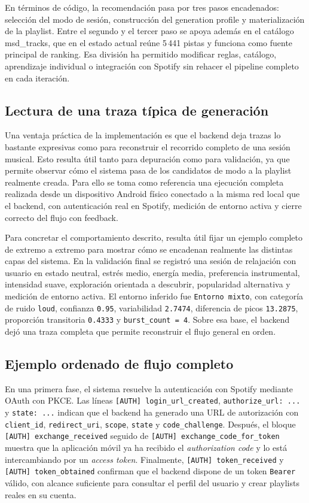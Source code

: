 En términos de código, la recomendación pasa por tres pasos encadenados:
selección del modo de sesión, construcción del generation profile y
materialización de la playlist. Entre el segundo y el tercer paso se apoya
además en el catálogo msd\_tracks, que en el estado actual reúne 5\,441
pistas y funciona como fuente principal de ranking. Esa división ha permitido
modificar reglas, catálogo, aprendizaje individual o integración con Spotify
sin rehacer el pipeline completo en cada iteración.

\subsection{Lectura de una traza típica de generación}

Una ventaja práctica de la implementación es que el backend deja trazas lo
bastante expresivas como para reconstruir el recorrido completo de una sesión
musical. Esto resulta útil tanto para depuración como para validación, ya que
permite observar cómo el sistema pasa de los candidatos de modo a la playlist
realmente creada. Para ello se toma como referencia una ejecución completa
realizada desde un dispositivo Android físico conectado a la misma red local
que el backend, con autenticación real en Spotify, medición de entorno activa y
cierre correcto del flujo con feedback.

Para concretar el comportamiento descrito, resulta útil fijar un ejemplo
completo de extremo a extremo para mostrar cómo se encadenan realmente las
distintas capas del sistema. En la validación final se registró una sesión de
relajación con usuario en estado neutral, estrés medio, energía media,
preferencia instrumental, intensidad suave, exploración orientada a descubrir,
popularidad alternativa y medición de entorno activa. El entorno inferido fue
\texttt{Entorno mixto}, con categoría de ruido \texttt{loud}, confianza
\texttt{0.95}, variabilidad \texttt{2.7474}, diferencia de picos
\texttt{13.2875}, proporción transitoria \texttt{0.4333} y
\texttt{burst\_count = 4}. Sobre esa base, el backend dejó una traza completa
que permite reconstruir el flujo general en orden.

\subsection{Ejemplo ordenado de flujo completo}

En una primera fase, el sistema resuelve la autenticación con Spotify mediante
OAuth con PKCE. Las líneas \texttt{[AUTH] login\_url\_created},
\texttt{authorize\_url: ...} y \texttt{state: ...} indican que el backend ha
generado una URL de autorización con \texttt{client\_id},
\texttt{redirect\_uri}, \texttt{scope}, \texttt{state} y
\texttt{code\_challenge}. Después, el bloque
\texttt{[AUTH] exchange\_received} seguido de
\texttt{[AUTH] exchange\_code\_for\_token} muestra que la aplicación móvil ya
ha recibido el \textit{authorization code} y lo está intercambiando por un
\textit{access token}. Finalmente, \texttt{[AUTH] token\_received} y
\texttt{[AUTH] token\_obtained} confirman que el backend dispone de un token
\texttt{Bearer} válido, con alcance suficiente para consultar el perfil del
usuario y crear playlists reales en su cuenta.

